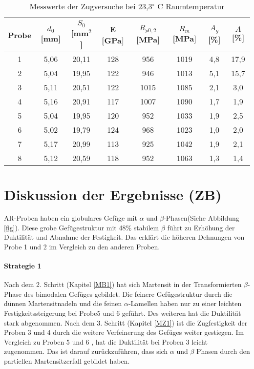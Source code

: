 \begin{table}[h]
	\centering
	\begin{tabular}{|c|c|c|c|c|c|c|c|}
		\hline
		Probe & $d_0$ [mm] & $S_0$ [mm$^2$] & E [GPa] & $R_{p0,2}$ [MPa]& $R_m$ [MPa]& $A_g$ [\%]& $A$ [\%]\\
		\hline
		1 & 5,06 & 20,11 & 128 & 956 & 1019&4,8&17,9 \\
		\hline
		2 &5,04&19,95&122&946&1013&5,1&15,7\\
		\hline
		3 & 5,11&20,51& 122&1015&1085&2,1&3,0\\
		\hline
		4 &5,16& 20,91& 117 & 1007& 1090& 1,7&  1,9 \\
		\hline
		5&5,04 &19,95& 120& 952& 1033& 1,9 &2,5\\
		\hline
		6 &5,02& 19,79& 124& 968& 1023 &1,0 & 2,0\\
		\hline
		7&5,17& 20,99& 113& 925& 1042& 1,9& 2,1\\
		\hline
		8 & 5,12 & 20,59 & 118 & 952 & 1063 & 1,3 & 1,4\\
		\hline
	\end{tabular}
	\label{tab:zugversuche}
	\caption{Messwerte der Zugversuche bei 23,3$^\circ$ C Raumtemperatur}
\end{table}

\section{Diskussion der Ergebnisse (ZB)}
AR-Proben haben ein globulares Gefüge mit $\alpha$ und $\beta$-Phasen(Siehe Abbildung \ref{fig}). Diese grobe Gefügestruktur mit 48\% stabilem $\beta$ führt zu Erhöhung der Duktilität und Abnahme der Festigkeit. Das erklärt die höheren Dehnungen von Probe 1 und 2 im Vergleich zu den anderen Proben.

\paragraph{Strategie 1}
Nach dem 2. Schritt (Kapitel \ref{MB1}) hat sich Martensit in der Transformierten $\beta$-Phase des bimodalen Gefüges gebildet. Die feinere Gefügestruktur  durch die dünnen Martensitnadeln und die feinen $\alpha$-Lamellen  haben nur zu einer leichten Festigkeitssteigerung bei Probe5 und 6 geführt. Des weiteren hat die Duktilität stark  abgenommen.
Nach dem 3. Schritt (Kapitel \ref{MZ1}) ist die Zugfestigkeit der Proben 3 und 4 durch die weitere Verfeinerung des Gefüges weiter gestiegen. Im Vergleich zu Proben 5 und 6 , hat die Duktilität bei Proben 3 leicht zugenommen. Das ist  darauf zurückzuführen, dass sich  $\alpha$ und  $\beta$ Phasen durch den partiellen Martensitzerfall gebildet haben.



